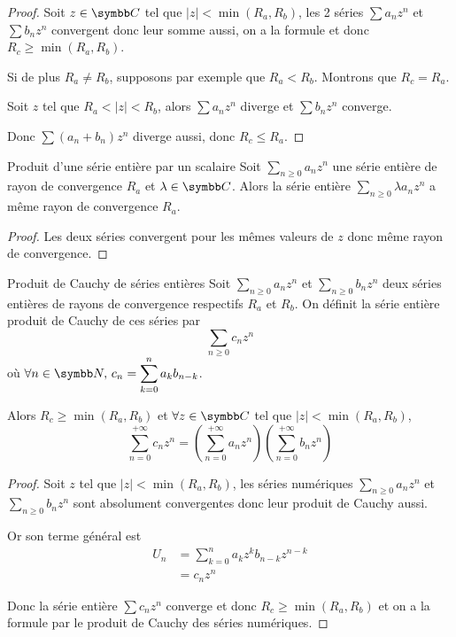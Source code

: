 \begin{proof}
    Soit $z \in \C$ tel que $|z| < \min(R_a, R_b)$, les 2 séries $\sum a_n z^n$ et $\sum b_n z^n$ 
    convergent donc leur somme aussi, on a la formule et donc $R_c \geqslant \min(R_a, R_b)$.

    Si de plus $R_a \neq R_b$, supposons par exemple que $R_a < R_b$. Montrons que $R_c = R_a$.

    Soit $z $ tel que $R_a < |z| < R_b$, alors $\sum a_n z^n$ diverge et $\sum b_n z^n$ converge.

    Donc $\sum (a_n + b_n) z^n$ diverge aussi, donc $R_c \leqslant R_a$.
\end{proof}

\begin{proposition}{Produit d'une série entière par un scalaire}{}
    Soit $\sum_{n \geqslant 0} a_n z^n$ une série entière de rayon de convergence $R_a$ et
    $\lambda \in \C$. Alors la série entière $\sum_{n \geqslant 0} \lambda a_n z^n$ a même 
    rayon de convergence $R_a$.
\end{proposition}

\begin{proof}
    Les deux séries convergent pour les mêmes valeurs de $z$ donc même rayon de convergence.
\end{proof}

\begin{theoreme}{Produit de Cauchy de séries entières}{}
    Soit $\sum_{n \geqslant 0} a_n z^n$ et $\sum_{n \geqslant 0} b_n z^n$ deux séries entières 
    de rayons de convergence respectifs $R_a$ et $R_b$. On définit la série entière produit de Cauchy 
    de ces séries par 
    $$\sum_{n \geqslant 0} c_n z^n$$ 
    où $\displaystyle \forall n \in \N, \, c_n = \sum_{k = 0}^n a_k b_{n - k}$.

    Alors $R_c \geqslant \min(R_a, R_b)$ et $\forall z \in \C$ tel que $|z| < \min(R_a, R_b)$, 
    $$\sum_{n = 0}^{+\infty} c_n z^n = \left( \sum_{n = 0}^{+\infty} a_n z^n \right) \left( \sum_{n = 0}^{+\infty} b_n z^n \right)$$
\end{theoreme}

\begin{proof}
    Soit $z$ tel que $|z| < \min(R_a, R_b)$, les séries numériques $\sum_{n \geqslant 0} a_n z^n$ 
    et $\sum_{n \geqslant 0} b_n z^n$ sont absolument convergentes donc leur produit de Cauchy 
    aussi. 

    Or son terme général est 
    \begin{align}
        U_n & = \sum_{k = 0}^n a_k z^k b_{n - k} z^{n - k} \\
        & = c_n z^n
    \end{align}

    Donc la série entière $\sum c_n z^n$ converge et donc $R_c \geqslant \min(R_a, R_b)$ et 
    on a la formule par le produit de Cauchy des séries numériques.
\end{proof}

